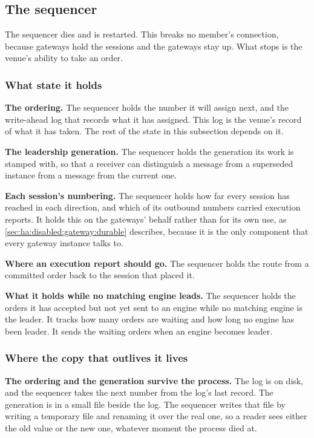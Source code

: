 \subsection{The sequencer}
\label{sec:ha:disabled:sequencer}

The sequencer dies and is restarted. This breaks no member's connection, because
gateways hold the sessions and the gateways stay up. What stops is the venue's
ability to take an order.

\subsubsection{What state it holds}
\label{sec:ha:disabled:sequencer:state}

\textbf{The ordering.} The sequencer holds the number it will assign next, and
the write-ahead log that records what it has assigned. This log is the venue's
record of what it has taken. The rest of the state in this subsection depends on
it.

\textbf{The leadership generation.} The sequencer holds the generation its work
is stamped with, so that a receiver can distinguish a message from a superseded
instance from a message from the current one.

\textbf{Each session's numbering.} The sequencer holds how far every session has
reached in each direction, and which of its outbound numbers carried execution
reports. It holds this on the gateways' behalf rather than for its own use, as
\cref{sec:ha:disabled:gateway:durable} describes, because it is the only
component that every gateway instance talks to.

\textbf{Where an execution report should go.} The sequencer holds the route from
a committed order back to the session that placed it.

\textbf{What it holds while no matching engine leads.} The sequencer holds the
orders it has accepted but not yet sent to an engine while no matching engine
is the leader. It tracks how many orders are waiting and how long no engine has
been leader. It sends the waiting orders when an engine becomes leader.

\subsubsection{Where the copy that outlives it lives}
\label{sec:ha:disabled:sequencer:durable}

\textbf{The ordering and the generation survive the process.} The log is on
disk, and the sequencer takes the next number from the log's last record. The
generation is in a small file beside the log. The sequencer writes that file by
writing a temporary file and renaming it over the real one, so a reader sees
either the old value or the new one, whatever moment the process died at.

